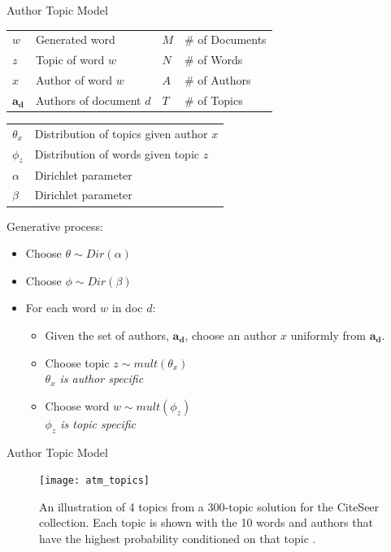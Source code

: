 \documentclass[10pt, svgnames]{beamer}
\begin{document}
\begin{frame}{Author Topic Model \cite{atm}}
	\begin{minipage}{0.5\linewidth} 
		\begin{center}
			
		\end{center}
		\tiny{
		\begin{tabular}{llll}
			$w$ & Generated word    & $M$ & \# of Documents \\
			$z$ & Topic of word $w$ & $N$ & \# of Words\\
			$x$ & Author of word $w$ & $A$ & \# of Authors   \\
			$\mathbf{a_d}$ & Authors of document $d$ & $T$ & \# of Topics
		\end{tabular}
		\begin{tabular}{ll}
			$\theta_x$ & Distribution of topics given author $x$ \\
			$\phi_z$   & Distribution of words given topic $z$ \\
			$\alpha$   & Dirichlet parameter \\
			$\beta$    & Dirichlet parameter
		\end{tabular}
		}
	\end{minipage}
	\begin{minipage}{0.45\linewidth}
		Generative process:
		\begin{itemize}
			\item \footnotesize{Choose $\theta \sim Dir(\alpha)$}
			\item \footnotesize{Choose $\phi \sim Dir(\beta)$}
			\item \footnotesize{For each word $w$ in doc $d$:}
				\begin{itemize}
					\item \footnotesize{Given the set of authors,
						$\mathbf{a_d}$, choose an author $x$ uniformly from
						$\mathbf{a_d}$}.
					\item \footnotesize{Choose topic $z \sim mult(\theta_x)$} \\
						\footnotesize{\textit{$\theta_x$ is author specific}}
					\item \footnotesize{Choose word $w \sim mult(\phi_z)$}\\
						\footnotesize{\textit{$\phi_z$ is topic specific}}
				\end{itemize}
		\end{itemize}
	\end{minipage}
\end{frame}
\begin{frame}{Author Topic Model}
	\begin{figure}[ht]
		\begin{center}
			\texttt{[image: atm\_topics]}
		\end{center}
		\caption{An illustration of 4 topics from a 300-topic
		solution for the CiteSeer collection. Each topic is
		shown with the 10 words and authors that have the
		highest probability conditioned on that topic \cite{atm}.
		}
		\label{fig:atm_topics}
	\end{figure}
\end{frame}
\end{document}
